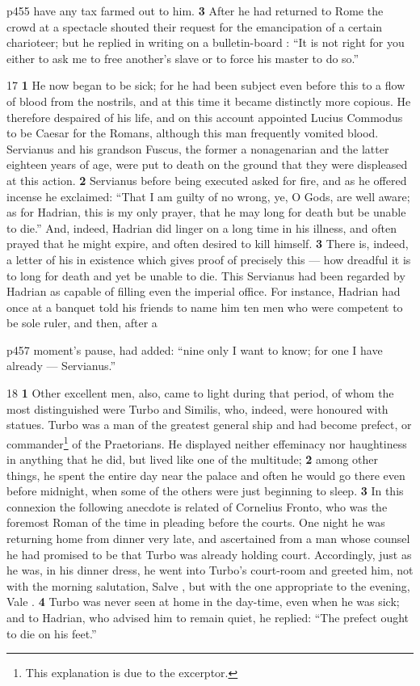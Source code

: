 p455 have any tax farmed out to him. \textbf{3} After he had returned to Rome the crowd at a spectacle shouted their request for the emancipation of a certain charioteer; but he replied in writing on a bulletin-board : ``It is not right for you either to ask me to free another's slave or to force his master to do so.''

17
\textbf{1} He now began to be sick; for he had been subject even before this to a flow of blood from the nostrils, and at this time it became distinctly more copious. He therefore despaired of his life, and on this account appointed Lucius Commodus to be Caesar for the Romans, although this man frequently vomited blood. Servianus and his grandson Fuscus, the former a nonagenarian and the latter eighteen years of age, were put to death on the ground that they were displeased at this action. \textbf{2} Servianus before being executed asked for fire, and as he offered incense he exclaimed: ``That I am guilty of no wrong, ye, O Gods, are well aware; as for Hadrian, this is my only prayer, that he may long for death but be unable to die.'' And, indeed, Hadrian did linger on a long time in his illness, and often prayed that he might expire, and often desired to kill himself. \textbf{3} There is, indeed, a letter of his in existence which gives proof of precisely this \texthebrew{—} how dreadful it is to long for death and yet be unable to die. This Servianus had been regarded by Hadrian as capable of filling even the imperial office. For instance, Hadrian had once at a banquet told his friends to name him ten men who were competent to be sole ruler, and then, after a

p457 moment's pause, had added: ``nine only I want to know; for one I have already \texthebrew{—} Servianus.''

18
\textbf{1} Other excellent men, also, came to light during that period, of whom the most distinguished were Turbo and Similis, who, indeed, were honoured with statues. Turbo was a man of the greatest general ­ship and had become prefect, or commander\texthebrew{⁠}\footnote{This explanation is due to the excerptor.

} of the Praetorians. He displayed neither effeminacy nor haughtiness in anything that he did, but lived like one of the multitude; \textbf{2} among other things, he spent the entire day near the palace and often he would go there even before midnight, when some of the others were just beginning to sleep. \textbf{3} In this connexion the following anecdote is related of Cornelius Fronto, who was the foremost Roman of the time in pleading before the courts. One night he was returning home from dinner very late, and ascertained from a man whose counsel he had promised to be that Turbo was already holding court. Accordingly, just as he was, in his dinner dress, he went into Turbo's court-room and greeted him, not with the morning salutation, Salve , but with the one appropriate to the evening, Vale . \textbf{4} Turbo was never seen at home in the day-time, even when he was sick; and to Hadrian, who advised him to remain quiet, he replied: ``The prefect ought to die on his feet.''

